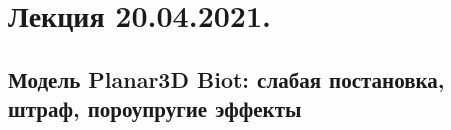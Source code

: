\documentclass[main.tex]{subfiles}
\begin{document}

\section{Лекция 20.04.2021.}

\subsection{Модель Planar3D Biot: слабая постановка, штраф, пороупругие эффекты}
\end{document}
